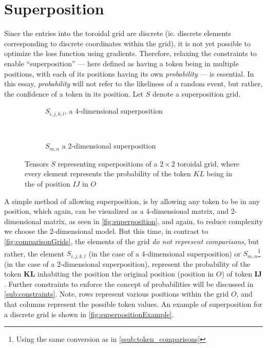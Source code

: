 
\section{Superposition}%
\label{sec:superposition}
Since the entries into the toroidal grid are discrete (ie. discrete elements corresponding to discrete coordinates within the grid), it is not yet possible to optimize the loss function using gradients. Therefore, relaxing the constraints to enable ``superposition'' --- here defined as having a token being in multiple positions, with each of its positions having its own \emph{probability} --- is essential. In this essay, \emph{probability} will not refer to the likeliness of a random event, but rather, the confidence of a token in its position. Let $S$ denote a superposition grid.
\begin{figure}[htpb]
    \centering
    \begin{subfigure}[t]{0.5\textwidth}
    \begin{center}
    \end{center}
    \caption{$S_{i,j,k,l}$, a 4-dimensional superposition}
    \end{subfigure}%
    ~
    \begin{subfigure}[t]{0.5\textwidth}
    \begin{center}
    \end{center}
    \caption{$S_{m,n}$ a 2-dimensional superposition}
    \end{subfigure}

    \caption{Tensors $S$ representing superpositions of a $2\times 2$ toroidal grid, where every element represents the probability of the token $KL$ being in the of position $IJ$ in $O$}%
    \label{fig:superposition}
\end{figure}

A simple method of allowing superposition, is by allowing any token to be in any position, which again, can be visualized as a 4-dimensional matrix, and 2-dimensional matrix, as seen in \autoref{fig:superposition}, and again, to reduce complexity we choose the 2-dimensional model. But this time, in contrast to \autoref{fig:comparisonGrids}, the elements of the grid \emph{do not represent comparisons}, but rather, the element $S_{i,j,k,l}$ (in the case of a 4-dimensional superposition) or $S_{m,n}$\footnote{Using the same conversion as in \ref{ssub:token_comparisons}} (in the case of a 2-dimensional superposition), represent the probability of the token $\bm{KL}$ inhabiting the position the original position (position in $O$) of token $\bm{IJ}$. Further constraints to enforce the concept of probabilities will be discussed in \ref{sub:constraints}. Note, rows represent various positions within the grid $O$, and that columns represent the possible token values. An example of superposition for a discrete grid is shown in \autoref{fig:superpositionExample}.

